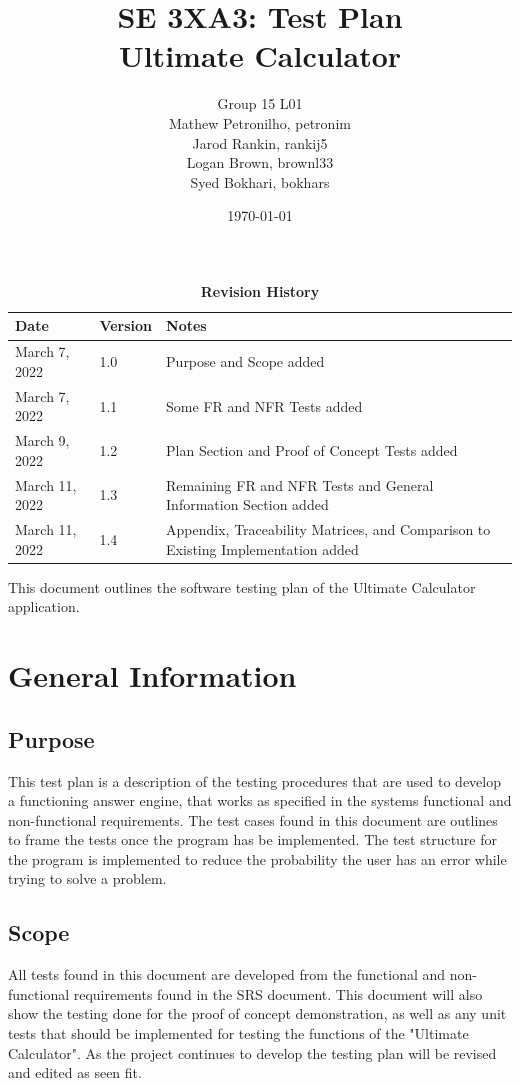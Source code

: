 \documentclass[12pt, titlepage]{article}
\title{SE 3XA3: Test Plan\\Ultimate Calculator}
\author{Group 15 L01
		\\ Mathew Petronilho, petronim
		\\ Jarod Rankin, rankij5
		\\ Logan Brown, brownl33
	    \\ Syed Bokhari, bokhars
}
\date{\today}
\begin{document}
\maketitle

\tableofcontents
\listoftables
\listoffigures

\begin{table}[bp]
\caption{\bf Revision History}
\begin{tabularx}{\textwidth}{p{3cm}p{2cm}X}
\toprule {\bf Date} & {\bf Version} & {\bf Notes}\\
\midrule
March 7, 2022 & 1.0 & Purpose and Scope added\\
March 7, 2022 & 1.1 & Some FR and NFR Tests added\\
March 9, 2022 & 1.2 & Plan Section and Proof of Concept Tests added\\
March 11, 2022 & 1.3 & Remaining FR and NFR Tests and General Information Section added\\
March 11, 2022 & 1.4 & Appendix, Traceability Matrices, and Comparison to Existing Implementation added\\
\bottomrule
\end{tabularx}
\end{table}

\newpage


This document outlines the software testing plan of the Ultimate Calculator application.

\section{General Information}

\subsection{Purpose}
This test plan is a description of the testing procedures that are used to develop a functioning answer engine, that works as specified in the systems functional and non-functional requirements. The test cases found in this document are outlines to frame the tests once the program has be implemented. The test structure for the program is implemented to reduce the probability the user has an error while trying to solve a problem.
\subsection{Scope}
All tests found in this document are developed from the functional and non-functional requirements found in the SRS document. This document will also show the testing done for the proof of concept demonstration, as well as any unit tests that should be implemented for testing the functions of the "Ultimate Calculator". As the project continues to develop the testing plan will be revised and edited as seen fit.
\end{document}
